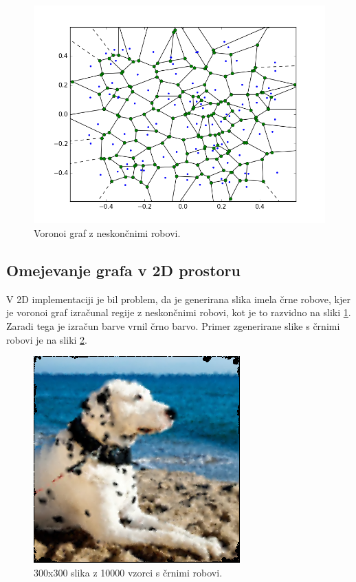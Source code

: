 \documentclass{egpubl}
\begin{document}
	\begin{figure}[htb]
		\centering
		\parbox[t]{.9\columnwidth}{\relax
			\includegraphics[width=.95\linewidth]{voronoi_inf.png}
		}
		\caption{\label{fig:voronoi_inf_edges}
			Voronoi graf z neskončnimi robovi.}
	\end{figure}
	
	\subsection{Omejevanje grafa v 2D prostoru}
	V 2D implementaciji je bil problem, da je generirana slika imela črne robove, kjer je voronoi graf izračunal regije z neskončnimi robovi, kot je to razvidno na sliki \ref{fig:voronoi_inf_edges}. Zaradi tega je izračun barve vrnil črno barvo. Primer zgenerirane slike s črnimi robovi je na sliki \ref{fig:black_edges}.
	
	\begin{figure}[htb]
		\centering
		\parbox[t]{.9\columnwidth}{\relax
			\includegraphics[width=.95\linewidth]{300x300x10000_black_edges.png}
		}
		\caption{\label{fig:black_edges}
			300x300 slika z 10000 vzorci s črnimi robovi.}
	\end{figure}
	
\end{document}
